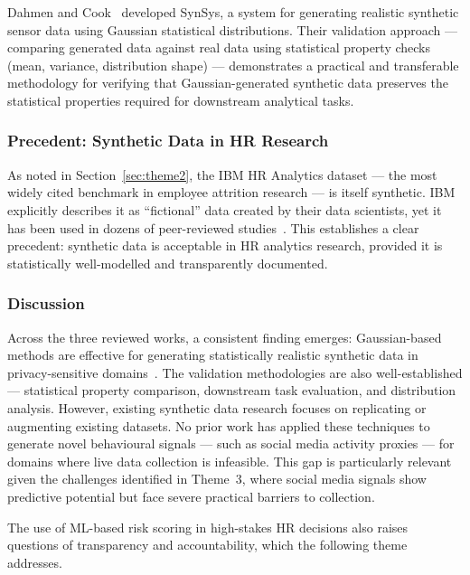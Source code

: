 \documentclass[12pt,a4paper]{article}
\begin{document}
Dahmen and Cook~\cite{dahmen2019synsys} developed SynSys, a system for generating realistic synthetic sensor data using Gaussian statistical distributions. Their validation approach --- comparing generated data against real data using statistical property checks (mean, variance, distribution shape) --- demonstrates a practical and transferable methodology for verifying that Gaussian-generated synthetic data preserves the statistical properties required for downstream analytical tasks.

\subsubsection{Precedent: Synthetic Data in HR Research}

As noted in Section~\ref{sec:theme2}, the IBM HR Analytics dataset --- the most widely cited benchmark in employee attrition research --- is itself synthetic. IBM explicitly describes it as ``fictional'' data created by their data scientists, yet it has been used in dozens of peer-reviewed studies~\cite{fallucchi2020attrition, jain2022ensemble, osman2025attrition}. This establishes a clear precedent: synthetic data is acceptable in HR analytics research, provided it is statistically well-modelled and transparently documented.

\subsubsection{Discussion}

Across the three reviewed works, a consistent finding emerges: Gaussian-based methods are effective for generating statistically realistic synthetic data in privacy-sensitive domains~\cite{figueira2024synthetic, gonzales2023synthetic, dahmen2019synsys}. The validation methodologies are also well-established --- statistical property comparison, downstream task evaluation, and distribution analysis. However, existing synthetic data research focuses on replicating or augmenting existing datasets. No prior work has applied these techniques to generate novel behavioural signals --- such as social media activity proxies --- for domains where live data collection is infeasible. This gap is particularly relevant given the challenges identified in Theme~3, where social media signals show predictive potential but face severe practical barriers to collection.

The use of ML-based risk scoring in high-stakes HR decisions also raises questions of transparency and accountability, which the following theme addresses.
\end{document}
